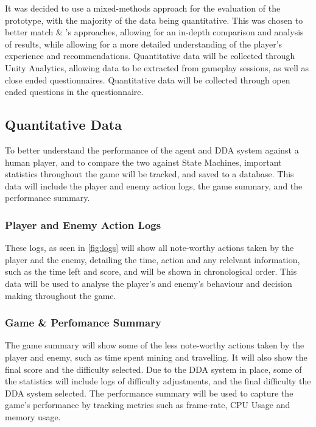 \begin{spacing}{2.0}

	It was decided to use a mixed-methods approach for the evaluation of the prototype, with the majority of the data being quantitative.
	This was chosen to better match \cite{grech_creating_2023} \& \cite{mercieca_evaluating_2023}'s approaches, allowing for an in-depth comparison and analysis of results,
	while allowing for a more detailed understanding of the player's experience and recommendations. Quantitative data will be collected through Unity Analytics, allowing data to be extracted from gameplay sessions,
	as well as close ended questionnaires. Quantitative data will be collected through open ended questions in the questionnaire.

	\subsection{Quantitative Data}

	To better understand the performance of the agent and DDA system against a human player, and to compare the two against State Machines, important statistics throughout the game will be tracked, and saved to a database.
	This data will include the player and enemy action logs, the game summary, and the performance summary.

	\subsubsection{Player and Enemy Action Logs}

	These logs, as seen in \ref{fig:logs} will show all note-worthy actions taken by the player and the enemy, detailing the time, action and any relelvant information, such as the time left and score, and will be shown in chronological order.
	This data will be used to analyse the player's and enemy's behaviour and decision making throughout the game.

	\subsubsection{Game \& Perfomance Summary}

	The game summary will show some of the less note-worthy actions taken by the player and enemy, such as time spent mining and travelling. It will also show the final score and the difficulty selected.
	Due to the DDA system in place, some of the statistics will include logs of difficulty adjustments, and the final difficulty the DDA system selected. The performance summary will be used to capture the
	game's performance by tracking metrics such as frame-rate, CPU Usage and memory usage.


\end{spacing}
